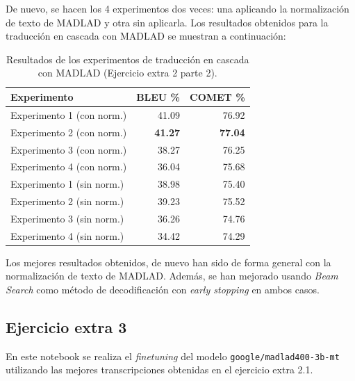 \documentclass[11pt,spanish,listoffigures,listoftables]{tfgetsinf}
\begin{document}
De nuevo, se hacen los 4 experimentos dos veces: una aplicando la normalización de texto de MADLAD y otra sin aplicarla. Los resultados obtenidos para la traducción en cascada con MADLAD se muestran a continuación:

\begin{table}[H]
\centering
\begin{tabular}{lrr}
	\toprule
	\textbf{Experimento}  & \textbf{BLEU \%} & \textbf{COMET \%} \\
	\midrule
	Experimento 1 (con norm.) & 41.09 & 76.92 \\
	Experimento 2 (con norm.) & \textbf{41.27} & \textbf{77.04} \\
	Experimento 3 (con norm.) & 38.27 & 76.25 \\
	Experimento 4 (con norm.) & 36.04 & 75.68 \\
	Experimento 1 (sin norm.) & 38.98 & 75.40 \\
	Experimento 2 (sin norm.) & 39.23 & 75.52 \\
	Experimento 3 (sin norm.) & 36.26 & 74.76 \\
	Experimento 4 (sin norm.) & 34.42 & 74.29 \\
	\bottomrule
\end{tabular}
\caption{Resultados de los experimentos de traducción en cascada con MADLAD (Ejercicio extra 2 parte 2).}
\label{tab:bleu_comet_extra2_2}
\end{table}

Los mejores resultados obtenidos, de nuevo han sido de forma general con la normalización de texto de MADLAD. Además, se han mejorado usando \textit{Beam Search} como método de decodificación con \textit{early stopping} en ambos casos.




\subsection{Ejercicio extra 3}
En este notebook se realiza el \textit{finetuning} del modelo \texttt{google/madlad400-3b-mt} utilizando las mejores transcripciones obtenidas en el ejercicio extra 2.1.
\end{document}
